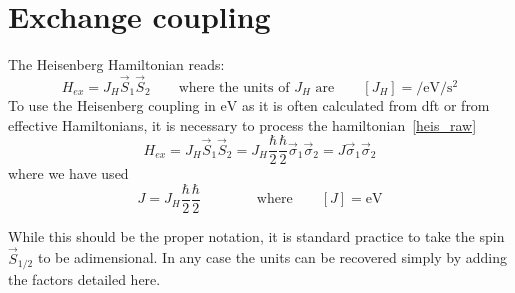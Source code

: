 \section{Exchange coupling}
The Heisenberg Hamiltonian reads:
\begin{equation}
  H_{ex} = J_H\vec{S}_1\vec{S}_2\qquad\text{where the units of $J_H$ are}\qquad
  [J_H]=\si{\per\eV\per\s\squared}
\label{heis_raw}
\end{equation}
To use the Heisenberg coupling in $\si{\eV}$ as it is often calculated from \ac{dft} or from effective Hamiltonians, it is necessary to process the hamiltonian~\eqref{heis_raw}
\begin{equation}
  H_{ex} = J_H\vec{S}_1\vec{S}_2 = J_H\frac{\hbar}{2}\frac{\hbar}{2}\vec{\sigma}_1\vec{\sigma}_2 =
  J\vec{\sigma}_1\vec{\sigma}_2
\end{equation}
where we have used
\begin{equation}
 J=J_H\frac{\hbar}{2}\frac{\hbar}{2}\qquad\qquad\text{where}\qquad [J]=\si{\eV}
\end{equation}

While this should be the proper notation, it is standard practice to take the spin $\vec{S}_{1/2}$ to be adimensional. In any case the units can be recovered simply by adding the factors detailed here.

